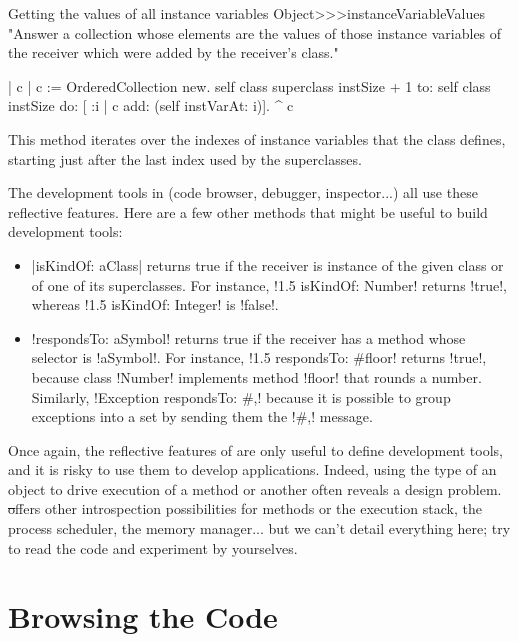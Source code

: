 \documentclass[a4paper,10pt,twoside]{book}
\begin{document}
\begin{method}[instanceVariableValues]{Getting the values of all instance variables}
Object>>>instanceVariableValues
	"Answer a collection whose elements are the values of those instance variables of the receiver which were added by the receiver's class."
	
	| c |
	c := OrderedCollection new.
	self class superclass instSize + 1
		to: self class instSize
		do: [ :i | c add: (self instVarAt: i)].
	^ c
\end{method}

This method iterates over the indexes of instance variables that the class defines, starting just after the last index used by the superclasses.

The development tools in \sq (code browser, debugger, inspector...) all use these reflective features.
Here are a few other methods that might be useful to build development tools:
\begin{itemize}
	\item \ct|isKindOf: aClass| returns true if the receiver is instance of the given class or of one of its superclasses.
	For instance, \ct!1.5 isKindOf: Number! returns \ct!true!, whereas \ct!1.5 isKindOf: Integer! is \ct!false!.
	\item \ct!respondsTo: aSymbol! returns true if the receiver has a method whose selector is \ct!aSymbol!.
	For instance, \ct!1.5 respondsTo: #floor! returns \ct!true!, because class \ct!Number! implements method \ct!floor! that rounds a number.
	Similarly, \ct!Exception respondsTo: #,! because it is possible to group exceptions into a set by sending them the \ct!#,! message.
\end{itemize}

Once again, the reflective features of \sq are only useful to define development tools, and it is risky to use them to develop applications.
Indeed, using the type of an object to drive execution of a method or another often reveals a design problem.
\st offers other introspection possibilities for methods or the execution stack, the process scheduler, the memory manager... but we can't detail everything here; try to read the code and experiment by yourselves.



\section{Browsing the Code} %
\end{document}

